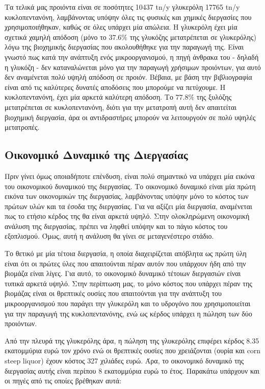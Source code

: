 \documentclass[11pt]{article}
\begin{document}
Τα τελικά μας προιόντα είναι σε ποσότητες 10437 tn/y γλυκερόλη 17765 tn/y κυκλοπεντανόνη, λαμβάνοντας υπόψην όλες τις φυσικές και χημικές διεργασίες που χρησιμοποιήθηκαν, καθώς σε όλες υπάρχει μία απώλεια. Η γλυκερόλη έχει μία σχετικά χαμηλή απόδοση (μόνο το \(37.6 \%\) της γλυκόζης μετατρέπεται σε γλυκερόλης) λόγω της βιοχημικής διεργασίας που ακολουθήθηκε για την παραγωγή της. Είναι γνωστό πως κατά την ανάπτυξη ενός μικροοργανισμού, η πηγή άνθρακα του - δηλαδή η γλυκόζη - δεν καταναλώνεται μόνο για την παραγωγή χρήσιμων προιόντων, για αυτό δεν αναμένεται πολύ υψηλή απόδοση σε προιόν. Βέβαια, με βάση την βιβλιογραφία είναι από τις καλύτερες δυνατές αποδόσεις που μπορούμε να πετύχουμε. Η κυκλοπεντανόνη, έχει μία αρκετά καλύτερη απόδοση. Το \(77.8 \%\) της ξυλόζης μετατρέπεται σε κυκλοπεντανόνη, διότι για την μετατροπή αυτή δεν απαιτείται βιοχημική διεργασία, άρα οι αντιδραστήρες μπορούν να λειτουργούν σε πολύ υψηλές μετατροπές.

\subsection{Οικονομικό Δυναμικό της Διεργασίας}
\label{sec:orgb7043fe}
Πριν γίνει όμως οποιαδήποτε επένδυση, είναι πολύ σημαντικό να υπάρχει μία εικόνα του οικονομικού δυναμικού της διεργασίας. Το οικονομικό δυναμικό είναι μία πρώτη εικόνα των οικονομικών της διεργασίας, λαμβάνοντας υπόψην μόνο το κόστος των πρώτων υλών και τα έσοδα της διεργασίας. Για να αξίζει μία διεργασία, αναμένεται πως το ετήσιο κέρδος της θα είναι αρκετά υψηλό. Στην ολοκληρώμενη οικονομική ανάλυση της διεργασίας, πρέπει να ληφθεί υπόψην και το πάγιο κόστος του εξοπλισμού. Όμως, αυτή η ανάλυση θα γίνει σε μεταγενέστερο στάδιο.

Το θετικό με μία τέτοια διεργασία, η οποία διαχειρίζεται απόβλητα ως πρώτη ύλη είναι ότι οι πρώτες ύλες που απαιτούνται πέραν αυτόν που υπάρχουν ήδη από την βιομάζα είναι λίγες. Για αυτό, το οικονομικό δυναμικό τέτοιων διεργασιών είναι τυπικά αρκετά υψηλό. Στην περίπτωση μας, το μόνο κόστος που υπάρχει πέραν της βιομάζας είναι οι θρεπτικές ουσίες που απαιτούνται για την ανάπτυξη του μικροοργανισμού που παράγει την γλυκερόλη και το υδρογόνο που χρησιμοποιείται για την παραγωγή της κυκλοπεντανόνης, ενώ ως κέρδος υπάρχει η πώληση των δύο προιόντων.

Από την πλευρά της γλυκερόλης άρα, η πώληση της γλυκερόλης επιφέρει κέρδος 8.35 εκατομμύρια ευρώ τον χρόνο ενώ οι θρεπτικές ουσίες που χρειάζονται (ουρία και corn steep liquor) έχουν κόστος 327 χιλιάδες ευρώ. Άρα, το οικονομικό δυναμικό της διεργασίας αυτής είναι περίπου 8 εκατομμύρια ευρώ το έτος. Παρακάτω υπάρχουν και οι πηγές από τις οποίες βρέθηκαν αυτά:
\end{document}
